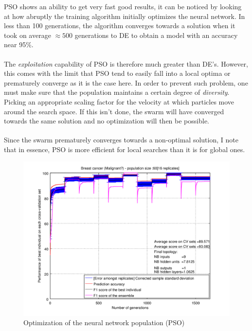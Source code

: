\documentclass[a4paper,12pt, oneside]{memoir}
\begin{document}
PSO shows an ability to get very fast good results, it can be noticed by looking at how abruptly the training algorithm initially optimizes the neural network. In less than 100 generations, the algorithm converges towards a solution when it took on average $\approx500$ generations to DE to obtain a model with an accuracy near 95\%. 
\\ \\
The \textit{exploitation} capability of PSO is therefore much greater than DE's. However, this comes with the limit that PSO tend to easily fall into a local optima or prematurely converge as it is the case here. In order to prevent such problem, one must make sure that the population maintains a certain degree of \textit{diversity}. Picking an appropriate scaling factor for the velocity at which particles move around the search space. If this isn't done, the swarm will have converged towards the same solution and no optimization will then be possible.
\\ \\
Since the swarm  prematurely converges towards a non-optimal solution, I note that in essence, PSO is more efficient for local searches than it is for global ones.

\begin{figure}[h]
  \centering
  \includegraphics[scale=0.7]{malignant-performancesVSepochs-PSO}
  \vspace{-12pt}
  \caption{Optimization of the neural network population (PSO)}
  \label{malignant-perfs-PSO}
\end{figure}
\end{document}
